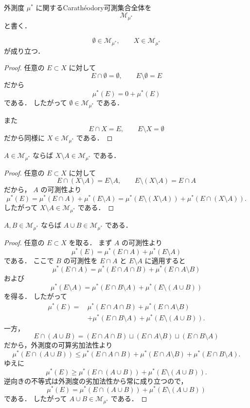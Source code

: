 \begin{definition}
外測度 $\mu^*$ に関するCarathéodory可測集合全体を
\[
\mathcal M_{\mu^*}
\]
と書く．
\end{definition}

\begin{lemma}
\[
\emptyset \in \mathcal M_{\mu^*},\qquad X \in \mathcal M_{\mu^*}
\]
が成り立つ．
\end{lemma}
\begin{proof}
任意の $E \subset X$ に対して
\[
E \cap \emptyset = \emptyset,\qquad E \setminus \emptyset = E
\]
だから
\[
\mu^*(E)=0+\mu^*(E)
\]
である．
したがって $\emptyset \in \mathcal M_{\mu^*}$ である．

また
\[
E \cap X = E,\qquad E \setminus X = \emptyset
\]
だから同様に $X \in \mathcal M_{\mu^*}$ である．
\end{proof}

\begin{lemma}[補集合に関する閉性]
$A \in \mathcal M_{\mu^*}$ ならば $X \setminus A \in \mathcal M_{\mu^*}$ である．
\end{lemma}
\begin{proof}
任意の $E \subset X$ に対して
\[
E \cap (X\setminus A)=E\setminus A,\qquad
E\setminus (X\setminus A)=E\cap A
\]
だから，
$A$ の可測性より
\[
\mu^*(E)
=
\mu^*(E\cap A)+\mu^*(E\setminus A)
=
\mu^*(E\setminus (X\setminus A))+\mu^*(E\cap (X\setminus A)).
\]
したがって $X\setminus A \in \mathcal M_{\mu^*}$ である．
\end{proof}

\begin{lemma}[有限和に関する閉性]
$A,B \in \mathcal M_{\mu^*}$ ならば $A \cup B \in \mathcal M_{\mu^*}$ である．
\end{lemma}
\begin{proof}
任意の $E \subset X$ を取る．
まず $A$ の可測性より
\[
\mu^*(E)=\mu^*(E\cap A)+\mu^*(E\setminus A)
\]
である．
ここで $B$ の可測性を $E\cap A$ と $E\setminus A$ に適用すると
\[
\mu^*(E\cap A)
=
\mu^*(E\cap A\cap B)+\mu^*(E\cap A\setminus B)
\]
および
\[
\mu^*(E\setminus A)
=
\mu^*(E\cap B\setminus A)+\mu^*(E\setminus (A\cup B))
\]
を得る．
したがって
\begin{align*}
\mu^*(E)
=\,&
\mu^*(E\cap A\cap B)
+\mu^*(E\cap A\setminus B) \\
&+\mu^*(E\cap B\setminus A)
+\mu^*(E\setminus (A\cup B)).
\end{align*}
一方，
\[
E\cap (A\cup B)
=
(E\cap A\cap B)\sqcup(E\cap A\setminus B)\sqcup(E\cap B\setminus A)
\]
だから，外測度の可算劣加法性より
\[
\mu^*(E\cap (A\cup B))
\le
\mu^*(E\cap A\cap B)
+\mu^*(E\cap A\setminus B)
+\mu^*(E\cap B\setminus A).
\]
ゆえに
\[
\mu^*(E)
\ge
\mu^*(E\cap (A\cup B))+\mu^*(E\setminus (A\cup B)).
\]
逆向きの不等式は外測度の劣加法性から常に成り立つので，
\[
\mu^*(E)
=
\mu^*(E\cap (A\cup B))+\mu^*(E\setminus (A\cup B))
\]
である．
したがって $A\cup B \in \mathcal M_{\mu^*}$ である．
\end{proof}

